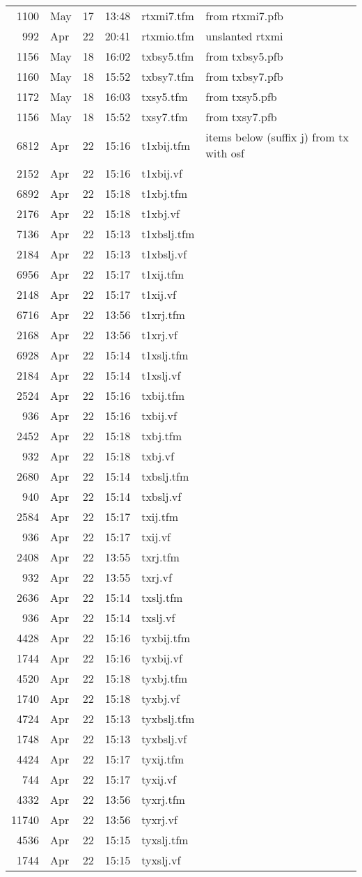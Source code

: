 \documentclass[10pt]{amsart}
\begin{document}
\begin{center}
\begin{longtable}{@{} rlrrll @{}}
1100&May&17&13:48&rtxmi7.tfm& from rtxmi7.pfb\\
992&Apr&22&20:41&rtxmio.tfm& unslanted rtxmi\\
1156&May&18&16:02&txbsy5.tfm& from txbsy5.pfb\\
1160&May&18&15:52&txbsy7.tfm& from txbsy7.pfb\\
1172&May&18&16:03&txsy5.tfm& from txsy5.pfb\\
1156&May&18&15:52&txsy7.tfm& from txsy7.pfb\\
6812&Apr&22&15:16&t1xbij.tfm& items below (suffix j) from tx with osf\\
2152&Apr&22&15:16&t1xbij.vf\\
6892&Apr&22&15:18&t1xbj.tfm\\
2176&Apr&22&15:18&t1xbj.vf\\
7136&Apr&22&15:13&t1xbslj.tfm\\
2184&Apr&22&15:13&t1xbslj.vf\\
6956&Apr&22&15:17&t1xij.tfm\\
2148&Apr&22&15:17&t1xij.vf\\
6716&Apr&22&13:56&t1xrj.tfm\\
2168&Apr&22&13:56&t1xrj.vf\\
6928&Apr&22&15:14&t1xslj.tfm\\
2184&Apr&22&15:14&t1xslj.vf\\
2524&Apr&22&15:16&txbij.tfm\\
936&Apr&22&15:16&txbij.vf\\
2452&Apr&22&15:18&txbj.tfm\\
932&Apr&22&15:18&txbj.vf\\
2680&Apr&22&15:14&txbslj.tfm\\
940&Apr&22&15:14&txbslj.vf\\
2584&Apr&22&15:17&txij.tfm\\
936&Apr&22&15:17&txij.vf\\
2408&Apr&22&13:55&txrj.tfm\\
932&Apr&22&13:55&txrj.vf\\
2636&Apr&22&15:14&txslj.tfm\\
936&Apr&22&15:14&txslj.vf\\
4428&Apr&22&15:16&tyxbij.tfm\\
1744&Apr&22&15:16&tyxbij.vf\\
4520&Apr&22&15:18&tyxbj.tfm\\
1740&Apr&22&15:18&tyxbj.vf\\
4724&Apr&22&15:13&tyxbslj.tfm\\
1748&Apr&22&15:13&tyxbslj.vf\\
4424&Apr&22&15:17&tyxij.tfm\\
744&Apr&22&15:17&tyxij.vf\\
4332&Apr&22&13:56&tyxrj.tfm\\
11740&Apr&22&13:56&tyxrj.vf\\
4536&Apr&22&15:15&tyxslj.tfm\\
1744&Apr&22&15:15&tyxslj.vf\\
    \bottomrule
  \end{longtable}
\end{center}
\end{document}
